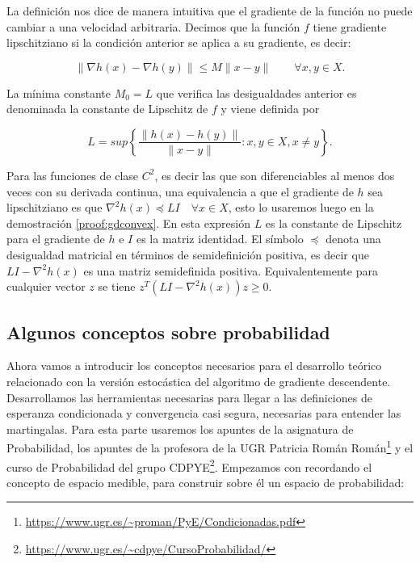 La definición nos dice de manera intuitiva que el gradiente de la función no puede cambiar a una velocidad arbitraria. Decimos que la función $f$ tiene gradiente lipschitziano si la condición anterior se aplica a su gradiente, es decir:

$$\| \nabla h(x) - \nabla h(y) \| \leq M \| x - y \| \qquad \forall x,y \in X .$$


La mínima constante $M_0=L$ que verifica las desigualdades anterior es denominada la constante de Lipschitz de $f$ y viene definida por 

$$L=sup \left \{ \frac{\|h(x)-h(y)\|}{\|x - y \|} : x,y \in X, x \neq y \right \}.$$



Para las funciones de clase $C^2$, es decir las que son diferenciables al menos dos veces con su derivada continua, una equivalencia a que el gradiente de $h$ sea lipschitziano es que $\nabla^2 h(x) \preceq LI \quad \forall x \in X$, esto lo usaremos luego en la demostración \ref{proof:gdconvex}. En esta expresión $L$ es la constante de Lipschitz para el gradiente de $h$ e $I$ es la matriz identidad. El símbolo $\preceq$ denota una desigualdad matricial en términos de semidefinición positiva, es decir que $LI - \nabla^2h(x)$ es una matriz semidefinida positiva. Equivalentemente para cualquier vector $z$ se tiene $z^T \left ( LI - \nabla^2h(x) \right )z \geq 0$. 

\subsection{Algunos conceptos sobre probabilidad}

Ahora vamos a introducir los conceptos necesarios para el desarrollo teórico relacionado con la versión estocástica del algoritmo de gradiente descendente. Desarrollamos las herramientas necesarias para llegar a las definiciones de esperanza condicionada y convergencia casi segura, necesarias para entender las martingalas. Para esta parte usaremos los apuntes de la asignatura de Probabilidad, los apuntes de la profesora de la UGR Patricia Román Román\footnote{\url{https://www.ugr.es/~proman/PyE/Condicionadas.pdf}} y el curso de Probabilidad del grupo CDPYE\footnote{\url{https://www.ugr.es/~cdpye/CursoProbabilidad/}}. Empezamos con recordando el concepto de espacio medible, para construir sobre él un espacio de probabilidad:

